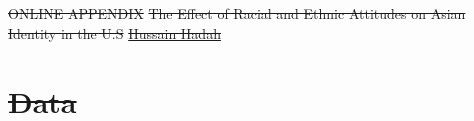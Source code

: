 \documentclass[12pt,english]{article}
\renewcommand{\thetable}{\arabic{table}}
\renewcommand{\thefigure}{\arabic{figure}}
\newcommand{\PAPERTITLE}{The Effect of Racial and Ethnic Attitudes on Asian Identity in the U.S}
\newcommand{\AUTHORHADAH}{Hussain Hadah}
\newcommand{\AUTHORHADAHURL}{https://orcid.org/0000-0002-8705-6386}
\providecommand{\DIFdeltex}[1]{{\protect\color{red}\sout{#1}}}                      %
\providecommand{\DIFdel}[1]{\texorpdfstring{\DIFdeltex{#1}}{}} %
\begin{document}


\DIFdel{ONLINE APPENDIX }%
\DIFdel{\PAPERTITLE}%
\href{\AUTHORHADAHURL}{\DIFdel{\AUTHORHADAH}}%


\section*{\DIFdel{Data}} %
\DIFdel{\label{sec:data-ap}
}%

\end{document}
